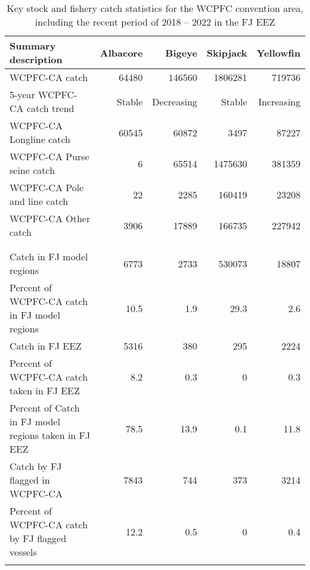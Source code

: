 \begin{longtable}{lrrrr}
\caption{Key stock and fishery catch statistics for the WCPFC convention area, including the recent period of 2018 -- 2022 in the FJ EEZ} \\ 
  \hline
Summary description & Albacore & Bigeye & Skipjack & Yellowfin \\ 
  \hline
WCPFC-CA catch & 64480 & 146560 & 1806281 & 719736 \\ 
  5-year WCPFC-CA catch trend & Stable & Decreasing & Stable & Increasing \\ 
  WCPFC-CA Longline catch & 60545 & 60872 & 3497 & 87227 \\ 
  WCPFC-CA Purse seine catch & 6 & 65514 & 1475630 & 381359 \\ 
  WCPFC-CA Pole and line catch & 22 & 2285 & 160419 & 23208 \\ 
  WCPFC-CA Other catch & 3906 & 17889 & 166735 & 227942 \\ 
   &  &  &  &  \\ 
   &  &  &  &  \\ 
   \hline
Catch in FJ model regions & 6773 & 2733 & 530073 & 18807 \\ 
  Percent of WCPFC-CA catch in FJ model regions & 10.5 & 1.9 & 29.3 & 2.6 \\ 
  Catch in FJ EEZ & 5316 & 380 & 295 & 2224 \\ 
  Percent of WCPFC-CA catch taken in FJ EEZ & 8.2 & 0.3 & 0 & 0.3 \\ 
  Percent of Catch in FJ model regions taken in FJ EEZ & 78.5 & 13.9 & 0.1 & 11.8 \\ 
  Catch by FJ flagged in WCPFC-CA & 7843 & 744 & 373 & 3214 \\ 
  Percent of WCPFC-CA catch by FJ flagged vessels & 12.2 & 0.5 & 0 & 0.4 \\ 
  \hline
\label{cat_sum_tab}
\end{longtable}
